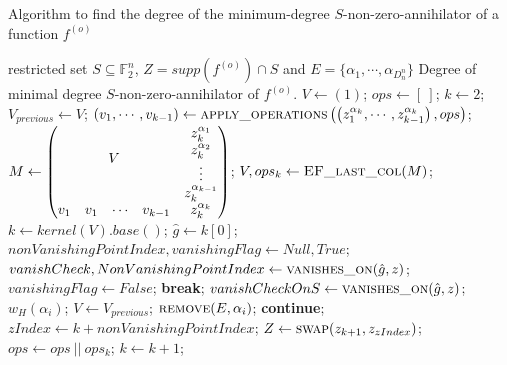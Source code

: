 \documentclass[11pt]{llncs}
\begin{document}
\begin{algorithm}\label{alg:AlgOnF0}
	\caption{Algorithm to find the degree of the minimum-degree $S$-non-zero-annihilator of a function $f^{(o)}$ \label{alg:MinDegreeSnonZeroAnnihilatorIterative}}
	\begin{algorithmic}[1]
		\Require restricted set $S\subseteq \mathbb{F}_2^n$, $Z = supp\left(f^{(o)}\right) \cap S$ and $E = \{\alpha_1, \cdots, \alpha_{D_n^n}\}$
		\Ensure Degree of minimal degree $S$-non-zero-annihilator of $f^{(o)}$.
		\State
		\State $V\gets (1)$;
		\State $ops \gets [\ ]$;
		\State $k \gets 2$;
		\State $V_{previous} \gets V$;
		\State $\left(v_1, \cdots, v_{k-1}\right) \gets \mbox{\textsc{apply\_operations}}\left(\left(z_1^{\alpha_k}, \cdots, z_{k-1}^{\alpha_k}\right), ops\right)$\footnotemark;
		\State  $M \gets \begin{pmatrix}
		\multicolumn{4}{c}{\multirow{4}{*}{$V$}} & z_k^{\alpha_1}\\
		& & & & z_k^{\alpha_2}\\
		& & & & \vdots\\
		& & & & z_k^{\alpha_{k-1}}\\
		v_1 & v_1& \cdots & v_{k-1} & z_k^{\alpha_k}
		\end{pmatrix}$;
		\State $V, ops_k\gets \mbox{\textsc{EF\_last\_col}}(M)$\footnotemark;
		\State $k \gets kernel\left(V\right).base()$;
		\State $\hat{g} \gets k[0]$;
		\State $nonVanishingPointIndex, vanishingFlag \gets Null, True$;
		\State $vanishCheck, NonVanishingPointIndex \gets \mbox{\textsc{vanishes\_on}}(\hat{g}, z)$\footnotemark;
		\State $vanishingFlag \gets False$;
		\State \textbf{break};
		\EndIf
		\State $vanishCheckOnS \gets \mbox{\textsc{vanishes\_on}}(\hat{g}, z)$;
		\State \Return $w_H\left(\alpha_i\right)$;
		\EndIf
		\EndFor
		\State $V\gets V_{previous}$;
		\State $\mbox{\textsc{remove}}(E, \alpha_i)$;
		\State \textbf{continue};
		\EndFor
		\State $zIndex \gets k+nonVanishingPointIndex$;
		\State $Z \gets \mbox{\textsc{swap}}(z_{k+1}, z_{zIndex})$\footnotemark;
		\State $ops\gets ops\ ||\ ops_k$;
		\State $k\gets k+1$;
		\EndIf
		\EndWhile
		\State {}
	\end{algorithmic}
\end{algorithm}
\newpage
\end{document}
